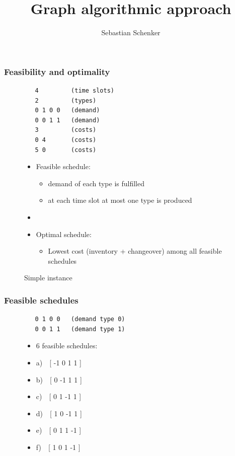 \documentclass{beamer}
\title{Graph algorithmic approach}
\author{Sebastian Schenker}
\date{}
\begin{document}
\frame{\titlepage}

\begin{frame}[fragile]
  \frametitle{Feasibility and optimality}
  \begin{figure}
    \begin{minipage}{0.45\textwidth}
          \caption{Simple instance}
\begin{verbatim}
   4         (time slots)
   2         (types)
   0 1 0 0   (demand)
   0 0 1 1   (demand)
   3         (costs)
   0 4       (costs)
   5 0       (costs)
\end{verbatim}
    \end{minipage}
    \hfill
    \begin{minipage}{0.45\textwidth}
      \begin{itemize}
    \item Feasible schedule:
      \begin{itemize}
      \item demand of each type is fulfilled
      \item at each time slot at most one type is produced
      \end{itemize}
    \item[]
    \item Optimal schedule:
      \begin{itemize}
      \item Lowest cost (inventory + changeover) among all
        feasible schedules
      \end{itemize}
    \end{itemize}
  \end{minipage}
\end{figure}
\end{frame}

\begin{frame}[fragile]
  \frametitle{Feasible schedules}
  \begin{figure}
    \begin{minipage}{0.45\textwidth}
\begin{verbatim}
   0 1 0 0   (demand type 0)
   0 0 1 1   (demand type 1)
\end{verbatim}
    \end{minipage}
    \hfill
    \begin{minipage}{0.45\textwidth}
      \begin{itemize}
      \item 6 feasible schedules:
      \item[] a)~~[ -1 0 1 1 ]
      \item[] b)~~[ 0 -1 1 1 ]
      \item[] c)~~[ 0 1 -1 1 ]
      \item[] d)~~[ 1 0 -1 1 ]
      \item[] e)~~[ 0 1 1 -1 ]
      \item[] f)~~[ 1 0 1 -1 ]
      \end{itemize}
    \end{minipage}
  \end{figure}
\end{frame}
\end{document}
